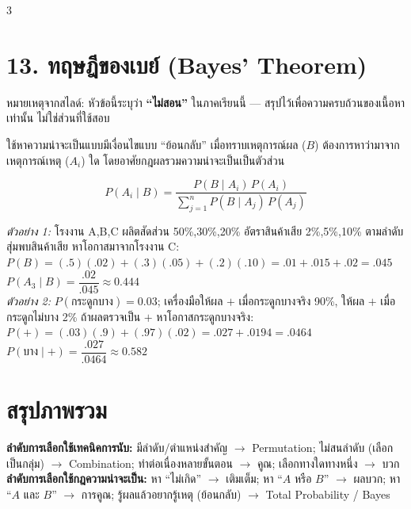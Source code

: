 \documentclass[9pt]{extarticle}
\begin{document}
\begin{multicols}{3}
\section*{13. ทฤษฎีของเบย์ (Bayes' Theorem)}
\begin{ideabox}
หมายเหตุจากสไลด์: หัวข้อนี้ระบุว่า \textbf{``ไม่สอน''} ในภาคเรียนนี้ — สรุปไว้เพื่อความครบถ้วนของเนื้อหาเท่านั้น ไม่ใช่ส่วนที่ใช้สอบ
\end{ideabox}
ใช้หาความน่าจะเป็นแบบมีเงื่อนไขแบบ ``ย้อนกลับ'' เมื่อทราบเหตุการณ์ผล ($B$) ต้องการหาว่ามาจากเหตุการณ์เหตุ ($A_i$) ใด โดยอาศัยกฎผลรวมความน่าจะเป็นเป็นตัวส่วน
\begin{formulabox}
$$P(A_i\mid B)=\frac{P(B\mid A_i)\,P(A_i)}{\sum_{j=1}^nP(B\mid A_j)\,P(A_j)}$$
\end{formulabox}
\begin{solbox}
\textit{ตัวอย่าง 1:} โรงงาน A,B,C ผลิตสัดส่วน 50\%,30\%,20\% อัตราสินค้าเสีย 2\%,5\%,10\% ตามลำดับ สุ่มพบสินค้าเสีย หาโอกาสมาจากโรงงาน C:\\
$P(B)=(.5)(.02){+}(.3)(.05){+}(.2)(.10)=.01{+}.015{+}.02=.045$\\
$P(A_3\mid B)=\dfrac{.02}{.045}\approx0.444$\\[4pt]
\textit{ตัวอย่าง 2:} $P(\text{กระดูกบาง})=0.03$; เครื่องมือให้ผล $+$ เมื่อกระดูกบางจริง 90\%, ให้ผล $+$ เมื่อกระดูกไม่บาง 2\% ถ้าผลตรวจเป็น $+$ หาโอกาสกระดูกบางจริง:\\
$P(+)=(.03)(.9){+}(.97)(.02)=.027{+}.0194=.0464$\\
$P(\text{บาง}\mid+)=\dfrac{.027}{.0464}\approx0.582$
\end{solbox}

\section*{สรุปภาพรวม}
\begin{formulabox}
\textbf{ลำดับการเลือกใช้เทคนิคการนับ:} มีลำดับ/ตำแหน่งสำคัญ $\to$ Permutation; ไม่สนลำดับ (เลือกเป็นกลุ่ม) $\to$ Combination; ทำต่อเนื่องหลายขั้นตอน $\to$ คูณ; เลือกทางใดทางหนึ่ง $\to$ บวก\\[3pt]
\textbf{ลำดับการเลือกใช้กฎความน่าจะเป็น:} หา ``ไม่เกิด'' $\to$ เติมเต็ม; หา ``$A$ หรือ $B$'' $\to$ ผลบวก; หา ``$A$ และ $B$'' $\to$ การคูณ; รู้ผลแล้วอยากรู้เหตุ (ย้อนกลับ) $\to$ Total Probability / Bayes
\end{formulabox}

\end{multicols}
\end{document}
